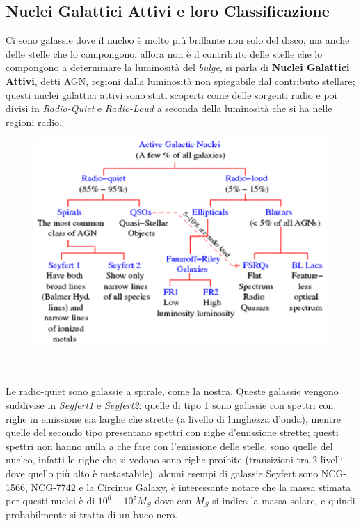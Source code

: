 \documentclass[a4paper,11pt]{article}
\begin{document}
\subsection{Nuclei Galattici Attivi e loro Classificazione}
 Ci sono galassie dove il nucleo è molto più brillante non solo del disco, ma anche delle stelle che lo compongono, allora non è il contributo delle stelle che lo compongono a determinare la luminosità del \textit{bulge}, si parla di \textbf{Nuclei Galattici Attivi}, detti AGN, regioni dalla luminosità non spiegabile dal contributo stellare; questi nuclei galattici attivi sono stati scoperti come delle sorgenti radio e poi divisi in \textit{Radio-Quiet} e \textit{Radio-Loud} a seconda della luminosità che si ha nelle regioni radio.\\
 \begin{figure} [h]
        \centering
        \includegraphics[width=\textwidth]{immagini_lezioni12-12/35.png}
        \label{}
    \end{figure}\\
 \\Le radio-quiet sono galassie a spirale, come la nostra. Queste galassie vengono suddivise in \textit{Seyfert1} e \textit{Seyfert2}: quelle di tipo 1 sono galassie con spettri con righe in emissione sia larghe che strette (a livello di lunghezza d'onda), mentre quelle del secondo tipo presentano spettri con righe d'emissione strette; questi spettri non hanno nulla a che fare con l'emissione delle stelle, sono quelle del nucleo, infatti le righe che si vedono sono righe proibite (transizioni tra 2 livelli dove quello più alto è metastabile); alcuni esempi di galassie Seyfert sono NCG-1566, NCG-7742 e la Circinus Galaxy, è interessante notare che la massa stimata per questi nuclei è di $10^6-10^7M_S$ dove con $M_S$ si indica la massa solare, e quindi probabilmente si tratta di un buco nero.\\
\end{document}
